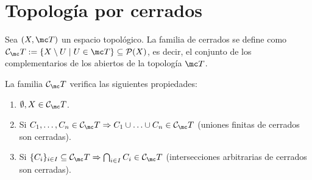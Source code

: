 \section{Topología por cerrados}

Sea \((X, \mc T)\) un espacio topológico. La familia de cerrados se define como \(\mathcal{C}_\mc T := \{X \setminus U \mid U \in \mc T\} \subseteq \mathcal{P}(X)\), es decir, el conjunto de los complementarios de los abiertos de la topología $\mc T$.

\begin{prop}
La familia \(\mathcal{C}_\mc T\) verifica las siguientes propiedades:
\begin{enumerate}
    \item[\textbf{1)}] \(\emptyset, X \in \mathcal{C}_\mc T\).
    \item[\textbf{2)}] Si \(C_1, \ldots, C_n \in \mathcal{C}_\mc T \Rightarrow C_1 \cup \ldots \cup C_n \in \mathcal{C}_\mc T\) (uniones finitas de cerrados son cerradas).
    \item[\textbf{3)}] Si \(\{C_i\}_{i \in I} \subseteq \mathcal{C}_\mc T \Rightarrow \bigcap_{i \in I} C_i \in \mathcal{C}_\mc T\) (intersecciones arbitrarias de cerrados son cerradas).
\end{enumerate}
\end{prop}

